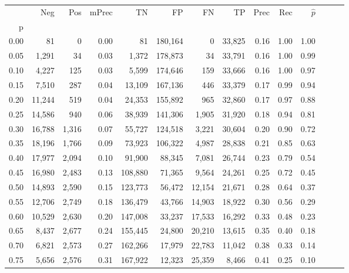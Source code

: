 \begin{tabular}{rrrrrrrrrrrrrr}
\toprule
{} &     Neg &    Pos & mPrec &       TN &       FP &      FN &      TP &  Prec &   Rec & $\hat{p}$ \\
p    &         &        &       &          &          &         &         &       &       &           \\
\midrule
0.00 &      81 &      0 &  0.00 &       81 &  180,164 &       0 &  33,825 &  0.16 &  1.00 &      1.00 \\
0.05 &   1,291 &     34 &  0.03 &    1,372 &  178,873 &      34 &  33,791 &  0.16 &  1.00 &      0.99 \\
0.10 &   4,227 &    125 &  0.03 &    5,599 &  174,646 &     159 &  33,666 &  0.16 &  1.00 &      0.97 \\
0.15 &   7,510 &    287 &  0.04 &   13,109 &  167,136 &     446 &  33,379 &  0.17 &  0.99 &      0.94 \\
0.20 &  11,244 &    519 &  0.04 &   24,353 &  155,892 &     965 &  32,860 &  0.17 &  0.97 &      0.88 \\
0.25 &  14,586 &    940 &  0.06 &   38,939 &  141,306 &   1,905 &  31,920 &  0.18 &  0.94 &      0.81 \\
0.30 &  16,788 &  1,316 &  0.07 &   55,727 &  124,518 &   3,221 &  30,604 &  0.20 &  0.90 &      0.72 \\
0.35 &  18,196 &  1,766 &  0.09 &   73,923 &  106,322 &   4,987 &  28,838 &  0.21 &  0.85 &      0.63 \\
0.40 &  17,977 &  2,094 &  0.10 &   91,900 &   88,345 &   7,081 &  26,744 &  0.23 &  0.79 &      0.54 \\
0.45 &  16,980 &  2,483 &  0.13 &  108,880 &   71,365 &   9,564 &  24,261 &  0.25 &  0.72 &      0.45 \\
0.50 &  14,893 &  2,590 &  0.15 &  123,773 &   56,472 &  12,154 &  21,671 &  0.28 &  0.64 &      0.37 \\
0.55 &  12,706 &  2,749 &  0.18 &  136,479 &   43,766 &  14,903 &  18,922 &  0.30 &  0.56 &      0.29 \\
0.60 &  10,529 &  2,630 &  0.20 &  147,008 &   33,237 &  17,533 &  16,292 &  0.33 &  0.48 &      0.23 \\
0.65 &   8,437 &  2,677 &  0.24 &  155,445 &   24,800 &  20,210 &  13,615 &  0.35 &  0.40 &      0.18 \\
0.70 &   6,821 &  2,573 &  0.27 &  162,266 &   17,979 &  22,783 &  11,042 &  0.38 &  0.33 &      0.14 \\
0.75 &   5,656 &  2,576 &  0.31 &  167,922 &   12,323 &  25,359 &   8,466 &  0.41 &  0.25 &      0.10 \\

\end{tabular}
